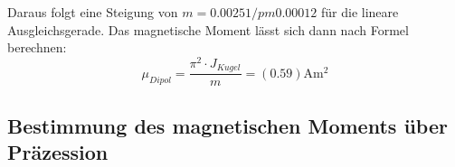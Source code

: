 Daraus folgt eine Steigung von $m=0.00251/pm 0.00012$ für die lineare Ausgleichsgerade.
Das magnetische Moment lässt sich dann nach Formel berechnen:
\begin{equation}
  \mu_{Dipol}= \frac{\pi^2 \cdot J_{Kugel}}{m}=(0.59)\si{\ampere\meter\squared}
\end{equation}
\subsection{Bestimmung des magnetischen Moments über Präzession}
